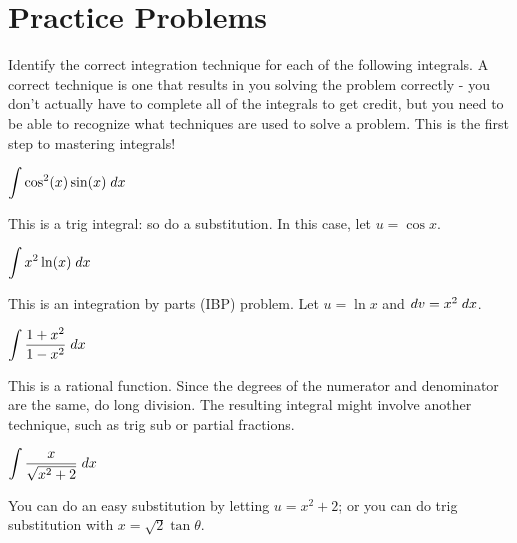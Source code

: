 \documentclass{ximera}
\begin{document}
\section*{Practice Problems}
Identify the correct integration technique for each of the following integrals. A correct technique is one that results in you solving the problem correctly - you don't actually have to complete all of the integrals to get credit, but you need to be able to recognize what techniques are used to solve a problem. This is the first step to mastering integrals!

\begin{problem}
$\displaystyle \int \cos^2(x) \sin(x) \; dx$
\begin{multipleChoice}
\end{multipleChoice}
\begin{feedback}[correct]
This is a trig integral: so do a substitution. In this case, let $u = \cos x$.
\end{feedback}
\end{problem}
\begin{problem}
$\displaystyle \int x^2 \ln(x) \; dx$
\begin{multipleChoice}
\end{multipleChoice}
\begin{feedback}[correct]
This is an integration by parts (IBP) problem. Let $u=\ln x$ and $dv = x^2 \; dx$.
\end{feedback}
\end{problem}
\begin{problem}
$\displaystyle \int \displaystyle\frac{1+x^2}{1-x^2} \; dx$
\begin{multipleChoice}
\end{multipleChoice}
\begin{feedback}[correct]
This is a rational function. Since the degrees of the numerator and denominator are the same, do long division. The resulting integral might involve another technique, such as trig sub or partial fractions.
\end{feedback}
\end{problem}
\begin{problem}
$\displaystyle \int \displaystyle\frac{x}{\sqrt{x^2 + 2}} \; dx$
\begin{multipleChoice}
\end{multipleChoice}
\begin{feedback}[correct]
You can do an easy substitution by letting $u = x^2 + 2$; or you can do trig substitution with $x=\sqrt{2}\tan \theta$.
\end{feedback}
\end{problem}
\end{document}
